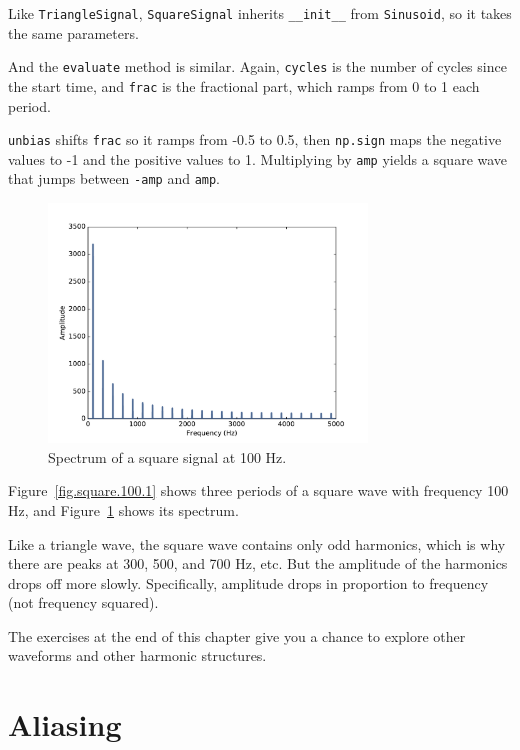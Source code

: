 \documentclass[12pt]{book}
\begin{document}
Like {\tt TriangleSignal}, {\tt SquareSignal} inherits
\verb"__init__" from {\tt Sinusoid}, so it takes the same
parameters.

And the {\tt evaluate} method is similar.  Again, {\tt cycles} is
the number of cycles since the start time, and {\tt frac} is the
fractional part, which ramps from 0 to 1 each period.

{\tt unbias} shifts {\tt frac} so it ramps from -0.5 to 0.5,
then {\tt np.sign} maps the negative values to -1 and the
positive values to 1.  Multiplying by {\tt amp} yields a square
wave that jumps between {\tt -amp} and {\tt amp}.

\begin{figure}
\centerline{\includegraphics[height=2.5in]{figs/square-100-2.pdf}}
\caption{Spectrum of a square signal at 100 Hz.}
\label{fig.square.100.2}
\end{figure}

Figure~\ref{fig.square.100.1} shows three periods of a square
wave with frequency 100 Hz,
and Figure~\ref{fig.square.100.2} shows its spectrum.

Like a triangle wave, the square wave contains only odd harmonics,
which is why there are peaks at 300, 500, and 700 Hz, etc.
But the amplitude of the harmonics drops off more slowly.
Specifically, amplitude drops in proportion to frequency (not frequency
squared).

The exercises at the end of this chapter give you a chance to
explore other waveforms and other harmonic structures.


\section{Aliasing}
\label{aliasing}
\end{document}
